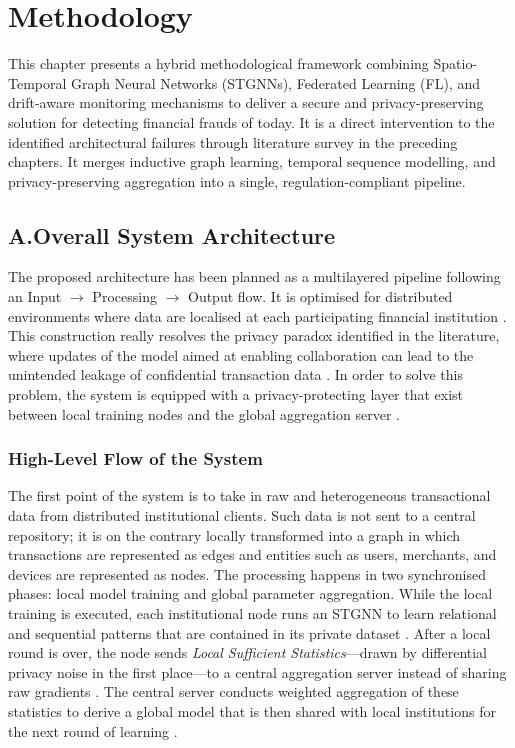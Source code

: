 \documentclass[12pt, a4paper]{article}
\begin{document}
\section{Methodology}
 
This chapter presents a hybrid methodological framework combining Spatio-Temporal Graph Neural Networks (STGNNs), Federated Learning (FL), and drift-aware monitoring mechanisms to deliver a secure and privacy-preserving solution for detecting financial frauds of today. It is a direct intervention to the identified architectural failures through literature survey in the preceding chapters. It merges inductive graph learning, temporal sequence modelling, and privacy-preserving aggregation into a single, regulation-compliant pipeline.
 
\subsection{A.\quad Overall System Architecture}
 
The proposed architecture has been planned as a multilayered pipeline following an Input $\rightarrow$ Processing $\rightarrow$ Output flow. It is optimised for distributed environments where data are localised at each participating financial institution \cite{flfraudreview2024}. This construction really resolves the privacy paradox identified in the literature, where updates of the model aimed at enabling collaboration can lead to the unintended leakage of confidential transaction data \cite{du2025hcgla}. In order to solve this problem, the system is equipped with a privacy-protecting layer that exist between local training nodes and the global aggregation server \cite{fedspfd2025mdpi}.
 
\subsubsection*{High-Level Flow of the System}
 
The first point of the system is to take in raw and heterogeneous transactional data from distributed institutional clients. Such data is not sent to a central repository; it is on the contrary locally transformed into a graph in which transactions are represented as edges and entities such as users, merchants, and devices are represented as nodes. The processing happens in two synchronised phases: local model training and global parameter aggregation. While the local training is executed, each institutional node runs an STGNN to learn relational and sequential patterns that are contained in its private dataset \cite{harper2025blockchain}. After a local round is over, the node sends \textit{Local Sufficient Statistics}---drawn by differential privacy noise in the first place---to a central aggregation server instead of sharing raw gradients \cite{localsuffstats2025}. The central server conducts weighted aggregation of these statistics to derive a global model that is then shared with local institutions for the next round of learning \cite{fedavg2017}.
 
\end{document}
